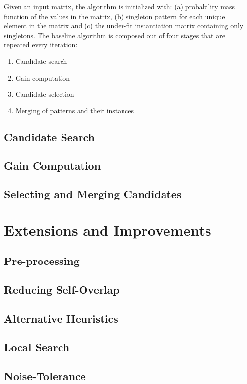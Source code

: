 \documentclass[a4paper,notoc,oneside]{tufte-book}
\begin{document}
Given an input matrix, the algorithm is initialized with: (a) probability mass function of the values in the matrix, (b) singleton pattern for each unique element in the matrix and (c) the under-fit instantiation matrix containing only singletons.  The baseline algorithm is composed out of four stages that are repeated every iteration:
\begin{enumerate}
\item Candidate search
\item Gain computation
\item Candidate selection
\item Merging of patterns and their instances
\end{enumerate}

\subsection{Candidate Search}
\subsection{Gain Computation}
\subsection{Selecting and Merging Candidates}

\section{Extensions and Improvements}

\subsection{Pre-processing}
\subsection{Reducing Self-Overlap}
\subsection{Alternative Heuristics}
\subsection{Local Search}
\subsection{Noise-Tolerance}
\end{document}
